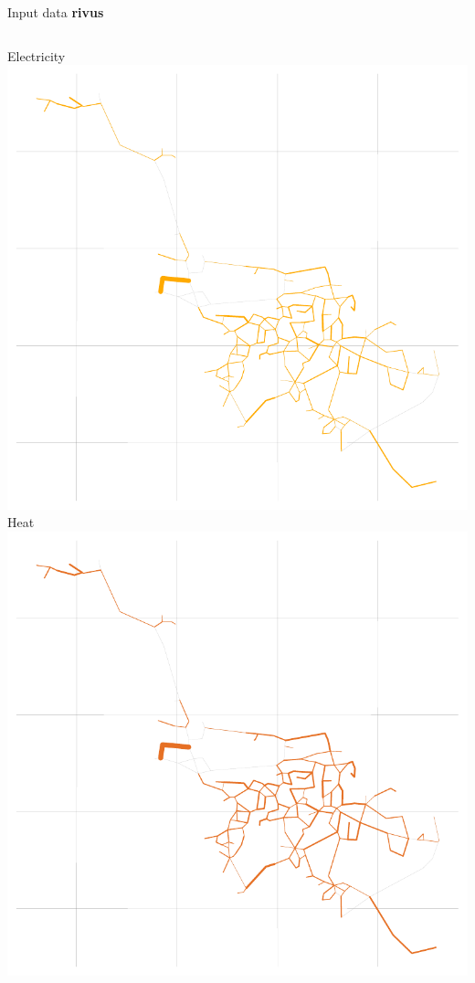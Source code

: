\begin{frame}{Input data \textbf{rivus}}
    \begin{columns}
        \column{\squeezethree}
        	\centering
        	\textcolor{elec}{Electricity} \vphantom{gÖ}
        	\includegraphics[width=\squeezethree]{img/haag/scenario_no_electric_heating-peak-Elec}
        \column{\squeezethree}
        	\centering
        	\textcolor{heat}{Heat} \vphantom{gÖ}
        	\includegraphics[width=\squeezethree]{img/haag/scenario_no_electric_heating-peak-Heat}
        \column{\squeezethree}
    \end{columns}


\end{frame}
